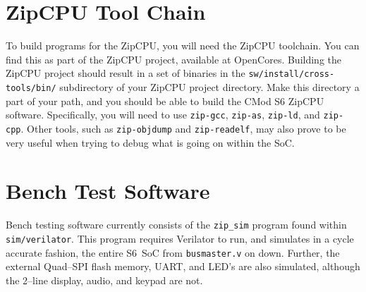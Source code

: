 \documentclass{gqtekspec}
\begin{document}
\section{ZipCPU Tool Chain}
To build programs for the ZipCPU, you will need the ZipCPU toolchain.  You
can find this as part of the ZipCPU project, available at OpenCores.  Building
the ZipCPU project should result in a set of binaries in the
\hbox{\tt sw/install/cross-tools/bin/} subdirectory of your ZipCPU project
directory.  Make this
directory a part of your path, and you should be able to build the CMod S6
ZipCPU software.  Specifically, you will need to use {\tt zip-gcc},
{\tt zip-as}, {\tt zip-ld}, and {\tt zip-cpp}.  Other tools, such as
{\tt zip-objdump} and {\tt zip-readelf}, may also prove to be very useful when
trying to debug what is going on within the SoC.

\section{Bench Test Software}

Bench testing software currently consists of the {\tt zip\_sim} program found
within {\tt sim/verilator}.  This program requires Verilator to run, and
simulates in a cycle accurate fashion, the entire S6~SoC from {\tt busmaster.v}
on down.  Further, the external Quad--SPI flash memory, UART, and LED's are
also simulated, although the 2--line display, audio, and keypad are not.
\end{document}
